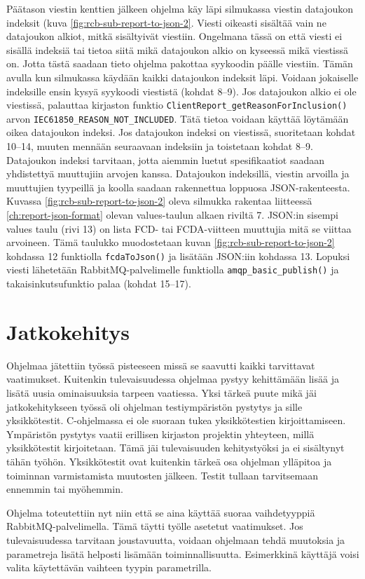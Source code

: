 Päätason viestin kenttien jälkeen ohjelma käy läpi silmukassa viestin datajoukon indeksit (kuva \ref{fig:rcb-sub-report-to-json-2}. Viesti oikeasti sisältää vain ne datajoukon alkiot, mitkä sisältyivät viestiin. Ongelmana tässä on että viesti ei sisällä indeksiä tai tietoa siitä mikä datajoukon alkio on kyseessä mikä viestissä on. Jotta tästä saadaan tieto ohjelma pakottaa syykoodin päälle viestiin. Tämän avulla kun silmukassa käydään kaikki datajoukon indeksit läpi. Voidaan jokaiselle indeksille ensin kysyä syykoodi viestistä (kohdat 8--9). Jos datajoukon alkio ei ole viestissä, palauttaa kirjaston funktio \texttt{ClientReport\_getReasonForInclusion()} arvon \texttt{IEC61850\_REASON\_NOT\_INCLUDED}. Tätä tietoa voidaan käyttää löytämään oikea datajoukon indeksi. Jos datajoukon indeksi on viestissä, suoritetaan kohdat 10--14, muuten mennään seuraavaan indeksiin ja toistetaan kohdat 8--9. Datajoukon indeksi tarvitaan, jotta aiemmin luetut spesifikaatiot saadaan yhdistettyä muuttujiin arvojen kanssa. Datajoukon indeksillä, viestin arvoilla ja muuttujien tyypeillä ja koolla saadaan rakennettua loppuosa JSON-rakenteesta. Kuvassa \ref{fig:rcb-sub-report-to-json-2} oleva silmukka rakentaa liitteessä \ref{ch:report-json-format} olevan values-taulun alkaen riviltä 7. JSON:in sisempi values taulu (rivi 13) on lista FCD- tai FCDA-viitteen muuttujia mitä se viittaa arvoineen. Tämä taulukko muodostetaan kuvan \ref{fig:rcb-sub-report-to-json-2} kohdassa 12 funktiolla \texttt{fcdaToJson()} ja lisätään JSON:iin kohdassa 13. Lopuksi viesti lähetetään RabbitMQ-palvelimelle funktiolla \texttt{amqp\_basic\_publish()} ja takaisinkutsufunktio palaa (kohdat 15--17).

\section{Jatkokehitys}
Ohjelmaa jätettiin työssä pisteeseen missä se saavutti kaikki tarvittavat vaatimukset. Kuitenkin tulevaisuudessa ohjelmaa pystyy kehittämään lisää ja lisätä uusia ominaisuuksia tarpeen vaatiessa. Yksi tärkeä puute mikä jäi jatkokehitykseen työssä oli ohjelman testiympäristön pystytys ja sille yksikkötestit. C-ohjelmassa ei ole suoraan tukea yksikkötestien kirjoittamiseen. Ympäristön pystytys vaatii erillisen kirjaston projektin yhteyteen, millä yksikkötestit kirjoitetaan. Tämä jäi tulevaisuuden kehitystyöksi ja ei sisältynyt tähän työhön. Yksikkötestit ovat kuitenkin tärkeä osa ohjelman ylläpitoa ja toiminnan varmistamista muutosten jälkeen. Testit tullaan tarvitsemaan ennemmin tai myöhemmin.

Ohjelma toteutettiin nyt niin että se aina käyttää suoraa vaihdetyyppiä RabbitMQ-palvelimella. Tämä täytti työlle asetetut vaatimukset. Jos tulevaisuudessa tarvitaan joustavuutta, voidaan ohjelmaan tehdä muutoksia ja parametreja lisätä helposti lisämään toiminnallisuutta. Esimerkkinä käyttäjä voisi valita käytettävän vaihteen tyypin parametrilla.